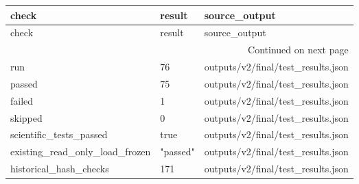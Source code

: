 \begin{longtable}{lll}
\toprule
check & result & source\_output \\
\midrule
\endfirsthead
\toprule
check & result & source\_output \\
\midrule
\endhead
\midrule
\multicolumn{3}{r}{Continued on next page} \\
\midrule
\endfoot
\bottomrule
\endlastfoot
run & 76 & outputs/v2/final/test\_results.json \\
passed & 75 & outputs/v2/final/test\_results.json \\
failed & 1 & outputs/v2/final/test\_results.json \\
skipped & 0 & outputs/v2/final/test\_results.json \\
scientific\_tests\_passed & true & outputs/v2/final/test\_results.json \\
existing\_read\_only\_load\_frozen & "passed" & outputs/v2/final/test\_results.json \\
historical\_hash\_checks & 171 & outputs/v2/final/test\_results.json \\
\end{longtable}
